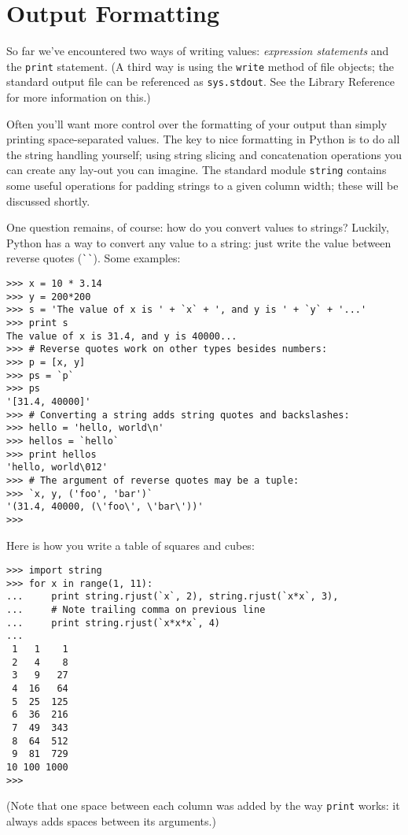 \chapter{Output Formatting}

So far we've encountered two ways of writing values: {\em expression
statements} and the {\tt print} statement.  (A third way is using the
{\tt write} method of file objects; the standard output file can be
referenced as {\tt sys.stdout}.  See the Library Reference for more
information on this.)

Often you'll want more control over the formatting of your output than
simply printing space-separated values.  The key to nice formatting in
Python is to do all the string handling yourself; using string slicing
and concatenation operations you can create any lay-out you can imagine.
The standard module {\tt string} contains some useful operations for
padding strings to a given column width; these will be discussed shortly.

One question remains, of course: how do you convert values to strings?
Luckily, Python has a way to convert any value to a string: just write
the value between reverse quotes (\verb/``/).  Some examples:

\bcode\begin{verbatim}
>>> x = 10 * 3.14
>>> y = 200*200
>>> s = 'The value of x is ' + `x` + ', and y is ' + `y` + '...'
>>> print s
The value of x is 31.4, and y is 40000...
>>> # Reverse quotes work on other types besides numbers:
>>> p = [x, y]
>>> ps = `p`
>>> ps
'[31.4, 40000]'
>>> # Converting a string adds string quotes and backslashes:
>>> hello = 'hello, world\n'
>>> hellos = `hello`
>>> print hellos
'hello, world\012'
>>> # The argument of reverse quotes may be a tuple:
>>> `x, y, ('foo', 'bar')`
'(31.4, 40000, (\'foo\', \'bar\'))'
>>>
\end{verbatim}\ecode
%
Here is how you write a table of squares and cubes:

\bcode\begin{verbatim}
>>> import string
>>> for x in range(1, 11):
...     print string.rjust(`x`, 2), string.rjust(`x*x`, 3),
...     # Note trailing comma on previous line
...     print string.rjust(`x*x*x`, 4)
...
 1   1    1
 2   4    8
 3   9   27
 4  16   64
 5  25  125
 6  36  216
 7  49  343
 8  64  512
 9  81  729
10 100 1000
>>>
\end{verbatim}\ecode
%
(Note that one space between each column was added by the way {\tt print}
works: it always adds spaces between its arguments.)

